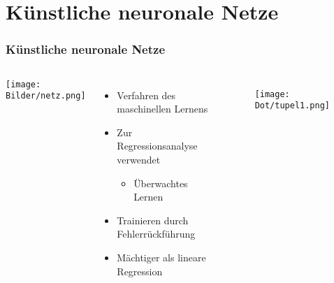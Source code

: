\documentclass{beamer}
\begin{document}
\section{Künstliche neuronale Netze}
\begin{frame}
\frametitle{Künstliche neuronale Netze}
\begin{columns}
\begin{center}
	\texttt{[image: Bilder/netz.png]}
\end{center}
\begin{itemize}
	\item Verfahren des maschinellen Lernens
	\item Zur Regressionsanalyse verwendet
		\begin{itemize}
			\item Überwachtes Lernen
		\end{itemize}
	\item Trainieren durch Fehlerrückführung
	\item Mächtiger als lineare Regression
\end{itemize}

\begin{figure}
	\texttt{[image: Dot/tupel1.png]}
\end{figure}
\end{columns}
\end{frame}
\end{document}
